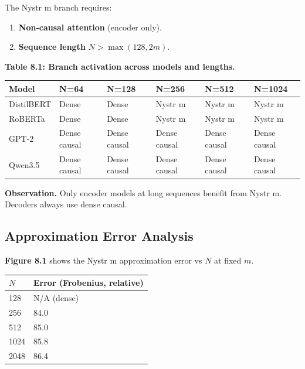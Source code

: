 The Nystr m branch requires:

\begin{enumerate}
\item \textbf{Non-causal attention} (encoder only).
\item \textbf{Sequence length} $N > \max(128, 2m)$.

\end{enumerate}
\textbf{Table 8.1: Branch activation across models and lengths.}

\begin{table}[H]
\centering
\small
\begin{tabular}{llllll}
\toprule
\textbf{Model} & \textbf{N=64} & \textbf{N=128} & \textbf{N=256} & \textbf{N=512} & \textbf{N=1024} \\
\midrule
DistilBERT & Dense & Dense & Nystr m & Nystr m & Nystr m \\
RoBERTa & Dense & Dense & Nystr m & Nystr m & Nystr m \\
GPT-2 & Dense causal & Dense causal & Dense causal & Dense causal & Dense causal \\
Qwen3.5 & Dense causal & Dense causal & Dense causal & Dense causal & Dense causal \\
\bottomrule
\end{tabular}
\end{table}

\textbf{Observation.} Only encoder models at long sequences benefit from 
Nystr m. Decoders always use dense causal.

\subsection{Approximation Error Analysis}

\textbf{Figure 8.1} shows the Nystr m approximation error vs $N$ at fixed $m$.

\begin{table}[H]
\centering
\small
\begin{tabular}{ll}
\toprule
\textbf{$N$} & \textbf{Error (Frobenius, relative)} \\
\midrule
128 & N/A (dense) \\
256 & 84.0 \\
512 & 85.0 \\
1024 & 85.8 \\
2048 & 86.4 \\
\bottomrule
\end{tabular}
\end{table}

